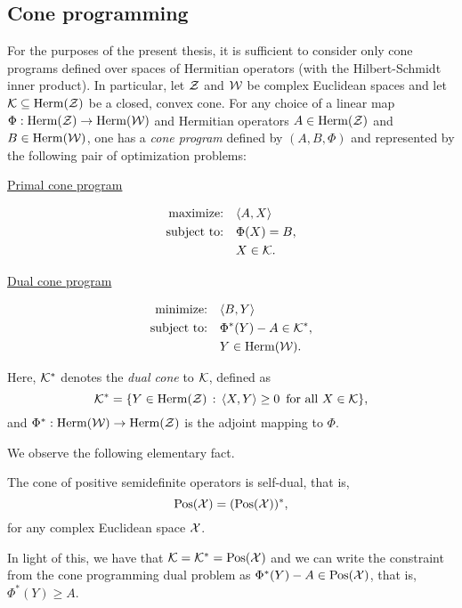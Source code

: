 \subsection*{Cone programming}
\label{sec:cone-programming}
For the purposes of the present thesis, it is sufficient to consider only cone
programs defined over spaces of Hermitian operators (with the Hilbert-Schmidt
inner product).
In particular, let $\mathcal{Z}$ and $\mathcal{W}$ be complex Euclidean spaces and let 
$\mathcal{K}\subseteq\mathrm{Herm}(\mathcal{Z})$ be a closed, convex cone.
For any choice of a linear map
$\Phi:\mathrm{Herm}(\mathcal{Z})\rightarrow\mathrm{Herm}(\mathcal{W})$ and
Hermitian operators $A\in\mathrm{Herm}(\mathcal{Z})$ and $B\in\mathrm{Herm}(\mathcal{W})$, one has a \emph{cone
program} defined by $(A,B,\Phi)$ and represented by the following pair of optimization problems:
\begin{center}
  \begin{minipage}{2in}
    \centerline{\underline{Primal cone program}}\vspace{-7mm}
    \begin{align*}
      \text{maximize:}\quad & \langle A , X\rangle\\
      \text{subject to:}\quad & \Phi(X) = B,\\
      & X \in \mathcal{K}.
    \end{align*}
  \end{minipage}
  \hspace*{1.5cm}
  \begin{minipage}{2.4in}
    \centerline{\underline{Dual cone program}}\vspace{-7mm}
    \begin{align*}
      \text{minimize:}\quad & \langle B , Y\rangle\\
      \text{subject to:}\quad & \Phi^{\ast}(Y) - A \in \mathcal{K}^{\ast},\\
      & Y\in\mathrm{Herm}(\mathcal{W}).
    \end{align*}
  \end{minipage}
\end{center}

Here, $\mathcal{K}^{\ast}$ denotes the \emph{dual cone} to $\mathcal{K}$, defined as
\begin{equation}
\label{eq:dual-cone}
  \mathcal{K}^{\ast} = \{Y\in\mathrm{Herm}(\mathcal{Z})\,:\,\langle X , Y\rangle \geq 0\;\:\text{for all $X\in\mathcal{K}$}\},
\end{equation}
and $\Phi^{\ast}:\mathrm{Herm}(\mathcal{W})\rightarrow\mathrm{Herm}(\mathcal{Z})$ is the adjoint mapping to
$\Phi$.

We observe the following elementary fact.
\begin{fact}
\label{fact:pos-self-dual}
The cone of positive semidefinite operators is self-dual, that is, 
\begin{equation}
\mathrm{Pos}(\mathcal{X}) = (\mathrm{Pos}(\mathcal{X}))^{\ast},
\end{equation}
for any complex Euclidean space $\mathcal{X}$.
\end{fact}
In light of this, we have that $\mathcal{K} = \mathcal{K}^{\ast} = \mathrm{Pos}(\mathcal{X})$ and we can write the
constraint from the cone programming dual problem as
$\Phi^{\ast}(Y) - A \in \mathrm{Pos}(\mathcal{X})$, that is, $\Phi^{\ast}(Y) \geq A$.

